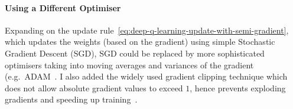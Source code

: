 \paragraph{Using a Different Optimiser}


Expanding on the update rule~\eqref{eq:deep-q-learning-update-with-semi-gradient}, which updates the weights (based on the gradient) using simple Stochastic Gradient Descent (SGD), SGD could be replaced by more sophisticated optimisers taking into moving averages and variances of the gradient (e.g.\ ADAM~\cite{kingma2015adamoptimiser}. I also added the widely used gradient clipping \cite{mikolov2012gradientclippingoriginal} technique which does not allow absolute gradient values to exceed $1$, hence prevents exploding gradients and speeding up training~\cite{zhang2020gradientclippingaccelerate}.

